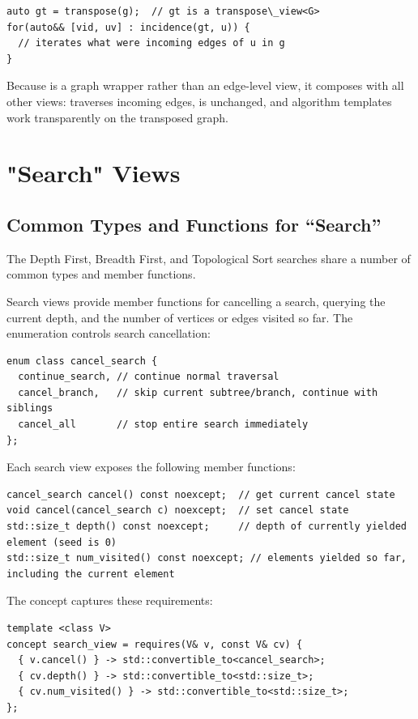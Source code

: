 \begin{lstlisting}
auto gt = transpose(g);  // gt is a transpose\_view<G>
for(auto&& [vid, uv] : incidence(gt, u)) {
  // iterates what were incoming edges of u in g
}
\end{lstlisting}

Because  is a graph wrapper rather than an edge-level view, it composes with all other views:  traverses incoming edges,  is unchanged, and algorithm templates work transparently on the transposed graph.

\section{"Search" Views}

\subsection{Common Types and Functions for ``Search'' }

The Depth First, Breadth First, and Topological Sort searches share a number of common types and member functions.

Search views provide member functions for cancelling a search, querying the current depth, and the number of vertices or edges visited so far. The  enumeration controls search cancellation:
\begin{lstlisting}
enum class cancel_search {
  continue_search, // continue normal traversal
  cancel_branch,   // skip current subtree/branch, continue with siblings
  cancel_all       // stop entire search immediately
};
\end{lstlisting}

Each search view exposes the following member functions:
\begin{lstlisting}
cancel_search cancel() const noexcept;  // get current cancel state
void cancel(cancel_search c) noexcept;  // set cancel state
std::size_t depth() const noexcept;     // depth of currently yielded element (seed is 0)
std::size_t num_visited() const noexcept; // elements yielded so far, including the current element
\end{lstlisting}

The  concept captures these requirements:
\begin{lstlisting}
template <class V>
concept search_view = requires(V& v, const V& cv) {
  { v.cancel() } -> std::convertible_to<cancel_search>;
  { cv.depth() } -> std::convertible_to<std::size_t>;
  { cv.num_visited() } -> std::convertible_to<std::size_t>;
};
\end{lstlisting}

